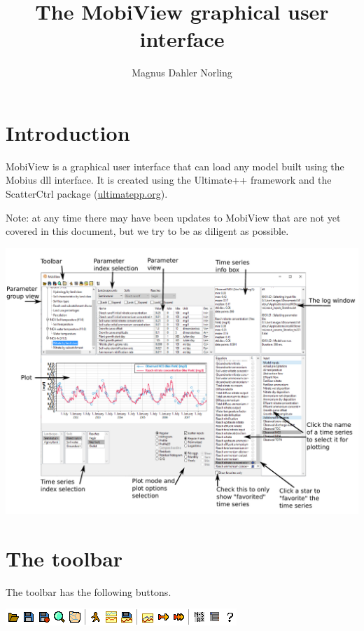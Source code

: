 \documentclass[11pt]{article}
\title{The MobiView graphical user interface}
\author{Magnus Dahler Norling}
\theoremstyle{definition}
\begin{document}
\maketitle

\tableofcontents

\section{Introduction}

MobiView is a graphical user interface that can load any model built using the Mobius dll interface. It is created using the Ultimate++ framework and the ScatterCtrl package (\url{ultimatepp.org}).

Note: at any time there may have been updates to MobiView that are not yet covered in this document, but we try to be as diligent as possible.

\begin{center}
\includegraphics[width=\linewidth]{img/mobiview}
\end{center}

\section{The toolbar}

The toolbar has the following buttons.

\begin{center}
\includegraphics[width=0.5\linewidth]{img/toolbar}
\end{center}
\end{document}
